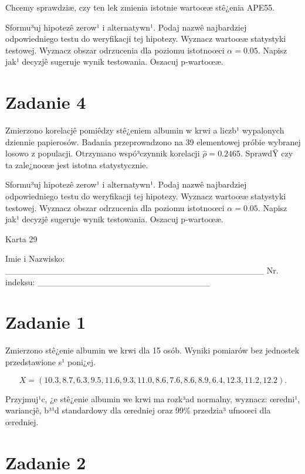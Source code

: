\documentclass[a4paper,12pt]{article}
\begin{document}
  Chcemy sprawdziæ, czy ten lek zmienia istotnie wartoœæ stê¿enia APE55.
  
  Sformu³uj hipotezê zerow¹ i alternatywn¹. 
  Podaj nazwê najbardziej odpowiedniego testu do weryfikacji tej hipotezy. 
  Wyznacz wartoœæ statystyki testowej. 
  Wyznacz obszar odrzucenia dla poziomu istotnoœci $\alpha=0.05$. 
  Napisz jak¹ decyzjê sugeruje wynik testowania. Oszacuj p-wartoœæ. \vspace{1cm} 

  \section*{Zadanie 4}
     
     Zmierzono korelacjê pomiêdzy stê¿eniem albumin w krwi a liczb¹ wypalonych dziennie papierosów. 
     Badania przeprowadzono na 39 elementowej próbie wybranej losowo z populacji. 
     Otrzymano wspó³czynnik korelacji $\hat\rho = 0.2465 $. 
     SprawdŸ czy ta zale¿noœæ jest istotna statystycznie. 
     
     Sformu³uj hipotezê zerow¹ i alternatywn¹. 
     Podaj nazwê najbardziej odpowiedniego testu do weryfikacji tej hipotezy. 
     Wyznacz wartoœæ statystyki testowej. 
     Wyznacz obszar odrzucenia dla poziomu istotnoœci $\alpha=0.05$. 
     Napisz jak¹ decyzjê sugeruje wynik testowania. 
     Oszacuj p-wartoœæ. \vspace{1cm} 

  \clearpage  Karta  29  

 Imie i Nazwisko: \_\_\_\_\_\_\_\_\_\_\_\_\_\_\_\_\_\_\_\_\_\_\_\_\_\_\_\_\_\_\_\_\_\_\_\_\_\_\_\_\_\_ Nr. indeksu: \_\_\_\_\_\_\_\_\_\_\_\_\_\_\_\_\_\_\_\_\_\_\_\_\_\_\_\_ 
 \section*{Zadanie 1}
     
     Zmierzono stê¿enie albumin we krwi dla 15 osób. 
     Wyniki pomiarów bez jednostek przedstawione s¹ poni¿ej. 
     
     \noindent $$X=( 10.3,  8.7,  6.3,  9.5, 11.6,  9.3, 11.0,  8.6,  7.6,  8.6,  8.9,  6.4, 12.3, 11.2, 12.2 ).$$
     
     Przyjmuj¹c, ¿e stê¿enie albumin we krwi ma rozk³ad normalny, 
     wyznacz: œredni¹, wariancjê, b³¹d standardowy dla œredniej oraz 99\% przedzia³ ufnoœci dla œredniej. \vspace{1cm} 

  \section*{Zadanie 2}
     
\end{document}
